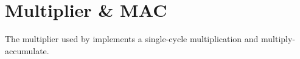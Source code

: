 \chapter{Multiplier \& MAC}

The multiplier used by \orion implements a single-cycle multiplication and
multiply-accumulate.
